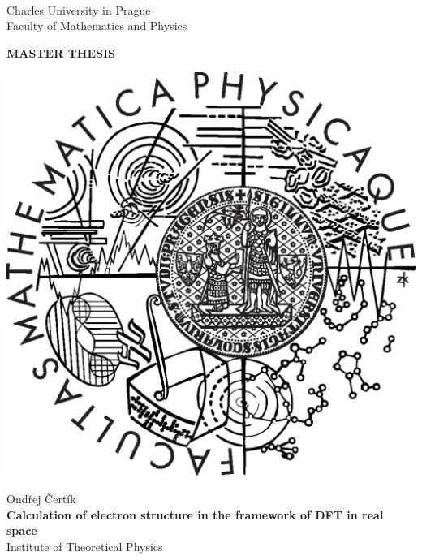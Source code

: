 \documentclass[12pt,notitlepage]{report}
\begin{document}
\begin{titlepage}
\begin{center}
\ \\

\vspace{15mm}

\large
Charles University in Prague\\
Faculty of Mathematics and Physics\\

\vspace{5mm}

{\Large\bf MASTER THESIS}

\vspace{10mm}

\includegraphics[scale=0.3]{logo.eps}

\vspace{15mm}

{\Large Ondřej Čertík}\\ 
\vspace{5mm}
{\Large\bf Calculation of electron structure in the framework of DFT in real
space}\\
\vspace{5mm}
Institute of Theoretical Physics\\ %
\end{center}
\vspace{15mm}


\end{titlepage}
\end{document}
